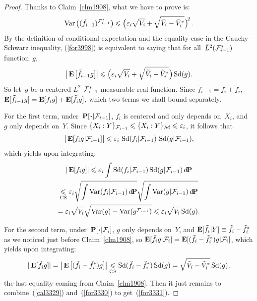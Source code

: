 \begingroup{}\begin{proof}
Thanks to Claim~\ref{clm1908}, what we have to prove is:
\[\label{for3998}
\Var\big((\tilde{f}_{i-1})^{\mcal{F}^*_{i-1}}\big) \leq \Big( \epsilon_i \sqrt{V_i} + \sqrt{\tilde{V}_i-\tilde{V}^*_i} \Big)^{\!2\,} .\]
By the definition of conditional expectation
and the equality case in the Cauchy--Schwarz inequality,
(\ref{for3998}) is equivalent to saying that for all~$\ldb(\mcal{F}^*_{i-1})$ function~$g$,
\[\label{for3331} \big| \EE \big[ \tilde{f}_{i-1} g \big] \big| \leq
\Big( \epsilon_i \sqrt{V_i} + \sqrt{\tilde{V}_i-\tilde{V}^*_i} \Big) \ecty(g) .\]
So let~$g$ be a centered $L^2$ $\mathcal{F}^*_{i-1}$-measurable real function.
Since $\tilde{f}_{i-1} = f_i + \tilde{f}_i$,
$\EE[\tilde{f}_{i-1}g] = \EE[f_ig] + \EE[\tilde{f}_ig]$,
which two terms we shall bound separately.

For the first term, under~$\Pr[\Bcdot|\ab \mcal{F}_{i-1}]$,
$f_i$ is centered and only depends on~$X_i$, and~$g$ only depends on~$Y$.
Since $\{ X_i : Y \}_{\mathcal{F}_{i-1}} \leqslant {\{ X_i : Y \}_{\mathcal{M}}} \leqslant \varepsilon_i$,
it follows that
\[ \big| \EE[f_ig|\mcal{F}_{i-1}] \big| \leq \epsilon_i \, \ecty(f_i|\mcal{F}_{i-1}) \, \ecty(g|\mcal{F}_{i-1}) ,\]
which yields upon integrating:
\begin{multline}\label{cal3329}
|\EE[f_ig]| \leq \epsilon_i \int \ecty(f_i|\mcal{F}_{i-1}) \ecty(g|\mcal{F}_{i-1}) \,\dx\Pr \\
\footrel{\text{CS}}{\leq} \epsilon_i \sqrt{\int \Var(f_i|\mcal{F}_{i-1}) \, \dx\Pr} \sqrt{\int \Var(g|\mcal{F}_{i-1}) \, \dx\Pr} \\
= \epsilon_i \sqrt{V_i} \sqrt{\Var(g) - \Var(g^{\mcal{F}_{i-1}})} \leq \epsilon_i \sqrt{V_i} \ecty(g) .
\end{multline}

For the second term, under~$\Pr[\Bcdot|\ab \mcal{F}_i]$,
$g$ only depends on~$Y$, and $\EE[\tilde{f}_i|Y]
\equiv \tilde{f}_i - \tilde{f}^*_i$ as we noticed just before Claim~\ref{clm1908},
so $\EE[\tilde{f}_ig|\mcal{F}_i] = \EE[{(\tilde{f}_i - \tilde{f}^*_i)}g | \mcal{F}_i]$,
which yields upon integrating:
\[\label{for3330} |\EE[\tilde{f}_ig]|
= \big| \EE \big[ (\tilde{f}_i - \tilde{f}^*_i) g \big] \big|
\footrel{\text{CS}}{\leq} \ecty(\tilde{f}_i - \tilde{f}^*_i) \ecty(g) = \sqrt{\tilde{V}_i - \tilde{V}^*_i} \ecty(g) ,\]
the last equality coming from Claim~\ref{clm1908}.
Then it just remains to combine~(\ref{cal3329}) and~(\ref{for3330})
to get~(\ref{for3331}).\linebreak[1]\strut
\end{proof}\endgroup

